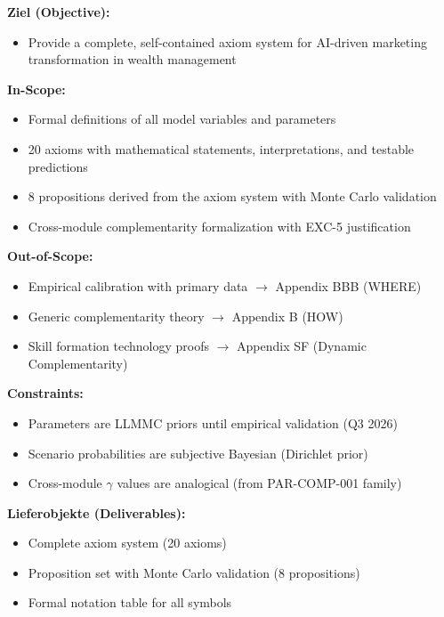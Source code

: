 \begin{tcolorbox}[
    colback=orange!5!white,
    colframe=orange!75!black,
    title={\textbf{Appendix Scope: Ziel / In-Scope / Out-of-Scope / Constraints}},
    fonttitle=\bfseries
]

\textbf{Ziel (Objective):}
\begin{itemize}[nosep]
\item Provide a complete, self-contained axiom system for AI-driven marketing transformation in wealth management
\end{itemize}

\textbf{In-Scope:}
\begin{itemize}[nosep]
\item Formal definitions of all model variables and parameters
\item 20 axioms with mathematical statements, interpretations, and testable predictions
\item 8 propositions derived from the axiom system with Monte Carlo validation
\item Cross-module complementarity formalization with EXC-5 justification
\end{itemize}

\textbf{Out-of-Scope:}
\begin{itemize}[nosep]
\item Empirical calibration with primary data $\rightarrow$ Appendix BBB (WHERE)
\item Generic complementarity theory $\rightarrow$ Appendix B (HOW)
\item Skill formation technology proofs $\rightarrow$ Appendix SF (Dynamic Complementarity)
\end{itemize}

\textbf{Constraints:}
\begin{itemize}[nosep]
\item Parameters are LLMMC priors until empirical validation (Q3 2026)
\item Scenario probabilities are subjective Bayesian (Dirichlet prior)
\item Cross-module $\gamma$ values are analogical (from PAR-COMP-001 family)
\end{itemize}

\textbf{Lieferobjekte (Deliverables):}
\begin{itemize}[nosep]
\item Complete axiom system (20 axioms)
\item Proposition set with Monte Carlo validation (8 propositions)
\item Formal notation table for all symbols
\end{itemize}

\end{tcolorbox}

